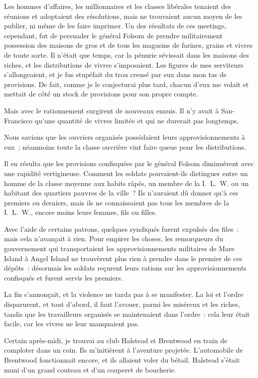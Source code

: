 \documentclass[french,twoside]{book} %
\begin{document}
Les hommes d’affaires, les millionnaires et les classes libérales tenaient des réunions et adoptaient des résolutions, mais ne trouvaient aucun moyen de les publier, ni même de les faire imprimer. Un des résultats de ces meetings, cependant, fut de persuader le général Folsom de prendre militairement possession des maisons de gros et de tous les magasins de farines, grains et vivres de toute sorte. Il n’était que temps, car la pénurie sévissait dans les maisons des riches, et les distributions de vivres s’imposaient. Les figures de mes serviteurs s’allongeaient, et je fus stupéfait du trou creusé par eux dans mon tas de provisions. De fait, comme je le conjecturai plus tard, chacun d’eux me volait et mettait de côté un stock de provisions pour son propre compte.\par
Mais avec le rationnement surgirent de nouveaux ennuis. Il n’y avait à San-Francisco qu’une quantité de vivres limitée et qui ne durerait pas longtemps.\par
Nous savions que les ouvriers organisés possédaient leurs approvisionnements à eux ; néanmoins toute la classe ouvrière vint faire queue pour les distributions.\par
Il en résulta que les provisions confisquées par le général Folsom diminuèrent avec une rapidité vertigineuse. Comment les soldats pouvaient-ils distinguer entre un homme de la classe moyenne aux habits râpés, un membre de la I. L. W. ou un habitant des quartiers pauvres de la ville ? Ils n’auraient dû donner qu’à ces premiers ou derniers, mais ils ne connaissaient pas tous les membres de la I. L. W., encore moins leurs femmes, fils ou filles.\par
Avec l’aide de certains patrons, quelques syndiqués furent expulsés des files : mais cela n’avançait à rien. Pour empirer les choses, les remorqueurs du gouvernement qui transportaient les approvisionnements militaires de Mare Island à Angel Island ne trouvèrent plus rien à prendre dans le premier de ces dépôts : désormais les soldats reçurent leurs rations sur les approvisionnements confisqués et furent servis les premiers.\par
La fin s’annonçait, et la violence ne tarda pas à se manifester. La loi et l’ordre disparurent, et tout d’abord, il faut l’avouer, parmi les miséreux et les riches, tandis que les travailleurs organisés se maintenaient dans l’ordre : cela leur était facile, car les vivres ne leur manquaient pas.\par
Certain après-midi, je trouvai au club Halstead et Brentwood en train de comploter dans un coin. Ils m’initièrent à l’aventure projetée. L’automobile de Brentwood fonctionnait encore, et ils allaient voler du bétail. Halstead s’était muni d’un grand couteau et d’un couperet de boucherie.\par
\end{document}
